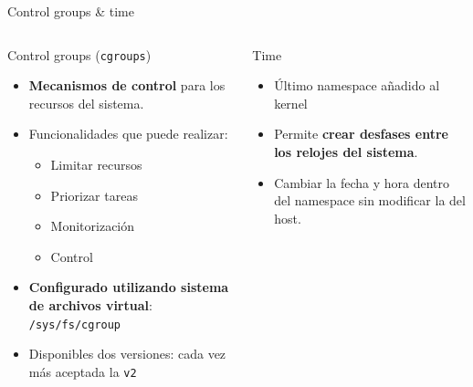 \documentclass[aspectratio=169,xcolor=dvipsnames]{beamer}
\begin{document}
    \begin{frame}{Control groups \& time}
        \begin{columns}
            \begin{column}{0.5\textwidth}
                \begin{block}{Control groups (\texttt{cgroups})}
                    \begin{itemize}
                        \item \textbf{Mecanismos de control} para los recursos del sistema.
                        \item Funcionalidades que puede realizar:
                        \begin{itemize}
                            \item Limitar recursos
                            \item Priorizar tareas
                            \item Monitorización
                            \item Control
                        \end{itemize}
                        \item \textbf{Configurado utilizando sistema de archivos virtual}: \texttt{/sys/fs/cgroup}
                        \item Disponibles dos versiones: cada vez más aceptada la \texttt{v2}
                    \end{itemize}
                \end{block}
            \end{column}
        
            \begin{column}{0.5\textwidth}
                \begin{block}{Time}
                    \begin{itemize}
                        \item Último namespace añadido al kernel
                        \item Permite \textbf{crear desfases entre los relojes del sistema}.
                        \item Cambiar la fecha y hora dentro del namespace sin modificar la del host.
                    \end{itemize}
                \end{block}
            \end{column}
        \end{columns}
    \end{frame}
	
\end{document}
